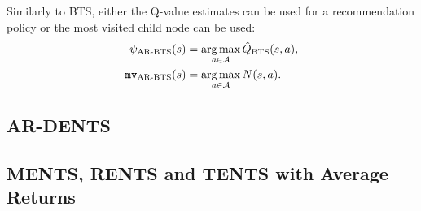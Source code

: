     Similarly to BTS, either the Q-value estimates can be used for a recommendation policy or the most visited child node can be used:
    \begin{align}
        {\psi_{{\textnormal{AR-BTS}}}}(s) &= \operatorname*{arg\,max}_{a\in\mathcal{A}}{\hat{Q}_{{\textnormal{BTS}}}}(s,a), \\
        {\textup{\texttt{mv}}_{{\textnormal{AR-BTS}}}}(s) &= \operatorname*{arg\,max}_{a\in\mathcal{A}} N(s,a).
    \end{align}


\subsection{AR-DENTS}
\label{app:ardents}


\subsection{MENTS, RENTS and TENTS with Average Returns} 
\label{app:arments}


